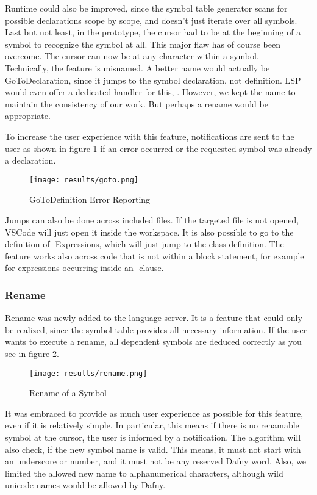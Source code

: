 Runtime could also be improved, since the symbol table generator scans for possible declarations scope by scope, and doesn't just iterate over all symbols.
Last but not least, in the prototype, the cursor had to be at the beginning of a symbol to recognize the symbol at all.
This major flaw has of course been overcome.
The cursor can now be at any character within a symbol.\\

Technically, the feature is misnamed.
A better name would actually be GoToDeclaration, since it jumps to the symbol declaration, not definition.
LSP would even offer a dedicated handler for this,  \cite{lspspec}.
However, we kept the name to maintain the consistency of our work.
But perhaps a rename would be appropriate.

To increase the user experience with this feature, notifications are sent to the user
as shown in figure \ref{fig:goto}
if an error occurred or the requested symbol was already a declaration.
\begin{figure}[H]
    \centering
    \texttt{[image: results/goto.png]}
    \caption{GoToDefinition Error Reporting}
    \label{fig:goto}
\end{figure}

Jumps can also be done across included files.
If the targeted file is not opened, VSCode will just open it inside the workspace.
It is also possible to go to the definition of -Expressions, which will just jump to the class definition.
The feature works also across code that is not within a block statement, for example for expressions occurring inside an -clause.

\subsubsection{Rename}
Rename was newly added to the language server.
It is a feature that could only be realized, since the symbol table provides all necessary information.
If the user wants to execute a rename, all dependent symbols are deduced correctly as you see in figure \ref{fig:rename}.

\begin{figure}[H]
    \centering
    \texttt{[image: results/rename.png]}
    \caption{Rename of a Symbol}
    \label{fig:rename}
\end{figure}

It was embraced to provide as much user experience as possible for this feature, even if it is relatively simple.
In particular, this means if there is no renamable symbol at the cursor, the user is informed by a notification.
The algorithm will also check, if the new symbol name is valid.
This means, it must not start with an underscore or number, and it must not be any reserved Dafny word.
Also, we limited the allowed new name to alphanumerical characters, although wild unicode names would be allowed by Dafny.\\

